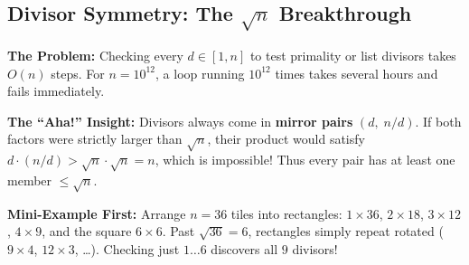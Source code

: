 \documentclass[11pt,a4paper]{article}
\theoremstyle{definition}
\newcommand{\painbeat}{\textbf{\color{accentamber}The Problem:} }
\newcommand{\ahabeat}{\textbf{\color{accentteal}The ``Aha!'' Insight:} }
\newcommand{\examplebeat}{\textbf{\color{primaryblue}Mini-Example First:} }
\begin{document}
\subsection{Divisor Symmetry: The \texorpdfstring{$\sqrt{n}$}{sqrt(n)} Breakthrough}

\painbeat Checking every $d \in [1, n]$ to test primality or list divisors takes $O(n)$ steps. For $n = 10^{12}$, a loop running $10^{12}$ times takes several hours and fails immediately.

\ahabeat Divisors always come in \textbf{mirror pairs} $(d,\; n / d)$. If both factors were strictly larger than $\sqrt{n}$, their product would satisfy $d \cdot (n / d) > \sqrt{n} \cdot \sqrt{n} = n$, which is impossible! Thus every pair has at least one member $\le \sqrt{n}$.

\examplebeat Arrange $n = 36$ tiles into rectangles: $1 \times 36$, $2 \times 18$, $3 \times 12$, $4 \times 9$, and the square $6 \times 6$. Past $\sqrt{36} = 6$, rectangles simply repeat rotated ($9 \times 4$, $12 \times 3$, \dots). Checking just $1 \dots 6$ discovers all $9$ divisors!
\end{document}
